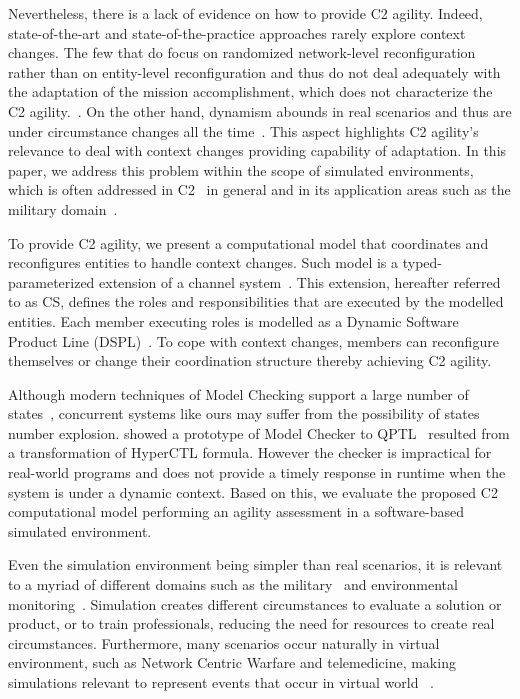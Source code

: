 Nevertheless, there is a lack of evidence on how to provide C2 agility. Indeed, state-of-the-art and state-of-the-practice approaches rarely explore context changes. The few that do focus on randomized network-level reconfiguration rather than on entity-level reconfiguration and thus do not deal adequately with the adaptation of the mission accomplishment, which does not characterize the C2 agility.~\citep{france2014,Alberts2017,evaluating,Alberts2011, nato01}. On the other hand, dynamism abounds in real scenarios  and thus are under circumstance changes all the time~\cite{evaluating}. This aspect highlights C2 agility's relevance to deal with context changes providing capability of adaptation. In this paper, we address this problem within the scope of simulated environments, which is often addressed in C2~\cite{CC02} in general and in its application areas such as the military domain~\cite{france2014}.

To provide C2 agility, we present a computational model that coordinates and reconfigures entities to handle context changes. Such model is a typed-parameterized extension of a channel system~\citep{modelcheckingBaier}. This extension, hereafter referred to as CS, defines the roles and responsibilities that are executed by the modelled entities. Each member executing roles is modelled as a Dynamic Software Product Line (DSPL)~\citep{Bencomo2008}. To cope with context changes, members can reconfigure themselves or change their coordination structure thereby achieving C2 agility.

Although modern techniques of Model Checking support a large number of states~\citep{modelcheckingBaier}, concurrent systems like ours may suffer from the possibility of states number explosion. \cite{clarkson2014} showed a prototype of Model Checker to QPTL~\citep{QPTL001} resulted from a transformation of HyperCTL formula. However the checker is impractical for real-world programs and does not provide a timely response in runtime when the system is under a dynamic context. Based on this, we evaluate the proposed C2 computational model performing an agility assessment in a software-based simulated environment.

Even the simulation environment being simpler than real scenarios, it is relevant to a myriad of different domains such as the military~\citep{CC03} and environmental monitoring~\cite{simulation001}. Simulation creates different circumstances to evaluate a solution or product, or to train professionals, reducing the need for resources to create real circumstances. Furthermore, many scenarios occur naturally in virtual environment, such as Network Centric Warfare and telemedicine, making simulations relevant to represent events that occur in virtual world
~\citep{telemedicine01, france2014, CC01}.

